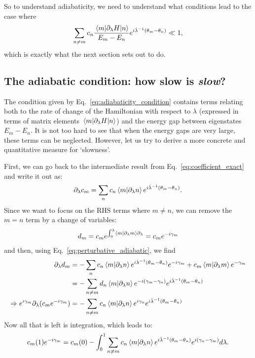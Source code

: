     So to understand adiabaticity, we need to understand what conditions lead to the case where
    \begin{equation}\label{eq:adiabaticity_condition}
        \sum_{n \neq m} c_n \frac{\mel{m}{\partial_{\lambda}H}{n}}{E_m - E_n}e^{i \dot{\lambda}^{-1} (\theta_m-\theta_n)} \ll 1,
    \end{equation}
    which is exactly what the next section sets out to do.
    
    \subsection{The adiabatic condition: how slow is \emph{slow}?}\label{sec:2.1.2_adiabatic_condition}

    The condition given by Eq.~\eqref{eq:adiabaticity_condition} contains terms relating both to the rate of change of the Hamiltonian with respect to $\lambda$ (expressed in terms of matrix elements $\mel{m}{\partial_{\lambda}H}{n}$) and the energy gap between eigenstates $E_m - E_n$. It is not too hard to see that when the energy gaps are very large, these terms can be neglected. However, let us try to derive a more concrete and quantitative measure for `slowness'.

    First, we can go back to the intermediate result from Eq.~\eqref{eq:coefficient_exact} and write it out as:
    \begin{equation}\label{eq:perturbative_adiabatic}
        \partial_{\lambda} c_m = \sum_n c_n \braket{m}{\partial_{\lambda} n}e^{i\dot{\lambda}^{-1}(\theta_m - \theta_n)}.
    \end{equation}
    Since we want to focus on the RHS terms where $m \neq n$, we can remove the $m = n$ term by a change of variables:
    \begin{equation}\label{eq:changing_variables}
        d_m = c_m e^{\int_0^{\lambda}\braket{m}{\partial_{\lambda} m} \partial_{\lambda}} = c_m e^{-i\gamma_m}
    \end{equation}
    and then, using Eq.~\eqref{eq:perturbative_adiabatic}, we find
    \begin{equation}\label{eq:n_neq_m_terms}
        \begin{aligned}
            \partial_{\lambda} d_m &= - \sum_n c_n \braket{m}{\partial_{\lambda} n}e^{i\dot{\lambda}^{-1}(\theta_m - \theta_n)}e^{-i\gamma_m} + c_m \braket{m}{\partial_{\lambda} m} e^{-\gamma_m} \\
            &= - \sum_{n \neq m} d_n \braket{m}{\partial_{\lambda} n} e^{-i(\gamma_m - \gamma_n)} e^{i\dot{\lambda}^{-1}(\theta_m - \theta_n)} \\
            \Rightarrow{} e^{i\gamma_m} \partial_{\lambda}(c_m e^{-i\gamma_m}) &= - \sum_{n \neq m} c_n \braket{m}{\partial_{\lambda} n} e^{i \gamma_n} e^{i\dot{\lambda}^{-1}(\theta_m - \theta_n)}
        \end{aligned}
    \end{equation}
    Now all that is left is integration, which leads to:
    \begin{equation}\label{eq:adiabatic_coefficients_dyanmics}
        c_m(1)e^{-i\gamma_m} = c_m(0) - \int_0^1 \sum_{n \neq m} c_n \braket{m}{\partial_{\lambda} n} e^{i\dot{\lambda}^{-1}(\theta_m - \theta_n)} e^{i(\gamma_n - \gamma_m)} d \lambda.
    \end{equation}

